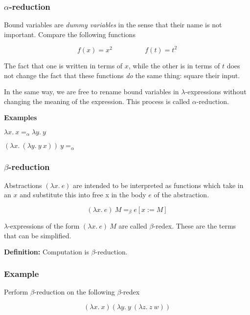 \documentclass{beamer}
\begin{document}
\begin{frame}
	\frametitle{$\alpha$-reduction}



	Bound variables are \emph{dummy variables} in the sense that their name is not important. Compare the following functions 

	$$f(x) = x^2 \hspace{2cm} f(t) = t^2$$

	The fact that one is written in terms of $x$, while the other is in terms of $t$ does not change the fact that these functions \emph{do} the same thing: square their input. 

	In the same way, we are free to rename bound variables in $\lambda$-expressions without changing the meaning of the expression. This process is called $\alpha$-reduction. 

	{\bf Examples}

	$\lambda x. \ x =_{\alpha} \lambda y. \ y$

	\vspace{0.1cm}

	$(\lambda x. \ (\lambda y. \ y \ x)) \ y =_\alpha$

\end{frame}

\begin{frame}
	\frametitle{$\beta$-reduction}

	Abstractions $(\lambda x. \ e)$ are intended to be interpreted as functions which take in an $x$ and substitute this into free x in the body $e$ of the abstraction. 

	$$(\lambda x. \ e) \ M =_{\beta} e[x:=M]$$

	$\lambda$-expressions of the form $(\lambda x. \ e) \ M$ are called $\beta$-redex. These are the terms that can be simplified.

	\vspace{30mm}

	{\bf Definition:} Computation is $\beta$-reduction.
	
\end{frame}

\begin{frame}
	\frametitle{Example}

	Perform $\beta$-reduction on the following $\beta$-redex

	$$(\lambda x. \ x)(\lambda y. \ y \ (\lambda z. \ z \ w))$$

	\vspace{6cm}


\end{frame}
\end{document}
